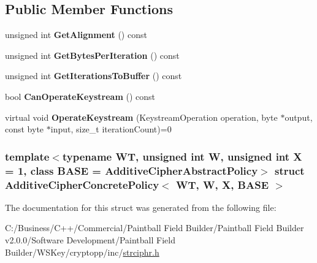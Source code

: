 \subsection*{Public Member Functions}
\begin{DoxyCompactItemize}
\item 
\hypertarget{struct_additive_cipher_concrete_policy_a900b7d37bbd99f38166d0b6c345ffd1a}{
unsigned int {\bfseries GetAlignment} () const }
\label{struct_additive_cipher_concrete_policy_a900b7d37bbd99f38166d0b6c345ffd1a}

\item 
\hypertarget{struct_additive_cipher_concrete_policy_a4896a260d3137d3b22f669c46ceba048}{
unsigned int {\bfseries GetBytesPerIteration} () const }
\label{struct_additive_cipher_concrete_policy_a4896a260d3137d3b22f669c46ceba048}

\item 
\hypertarget{struct_additive_cipher_concrete_policy_a52e6ddb14d246bffded57768f6b0c44f}{
unsigned int {\bfseries GetIterationsToBuffer} () const }
\label{struct_additive_cipher_concrete_policy_a52e6ddb14d246bffded57768f6b0c44f}

\item 
\hypertarget{struct_additive_cipher_concrete_policy_afe05a4a31d1516aeeb2003e5898b9c8d}{
bool {\bfseries CanOperateKeystream} () const }
\label{struct_additive_cipher_concrete_policy_afe05a4a31d1516aeeb2003e5898b9c8d}

\item 
\hypertarget{struct_additive_cipher_concrete_policy_a88ce0905757bcc373f028bfd9e0dec43}{
virtual void {\bfseries OperateKeystream} (KeystreamOperation operation, byte $\ast$output, const byte $\ast$input, size\_\-t iterationCount)=0}
\label{struct_additive_cipher_concrete_policy_a88ce0905757bcc373f028bfd9e0dec43}

\end{DoxyCompactItemize}
\subsubsection*{template$<$typename WT, unsigned int W, unsigned int X = 1, class BASE = AdditiveCipherAbstractPolicy$>$ struct AdditiveCipherConcretePolicy$<$ WT, W, X, BASE $>$}



The documentation for this struct was generated from the following file:\begin{DoxyCompactItemize}
\item 
C:/Business/C++/Commercial/Paintball Field Builder/Paintball Field Builder v2.0.0/Software Development/Paintball Field Builder/WSKey/cryptopp/inc/\hyperlink{strciphr_8h}{strciphr.h}\end{DoxyCompactItemize}
